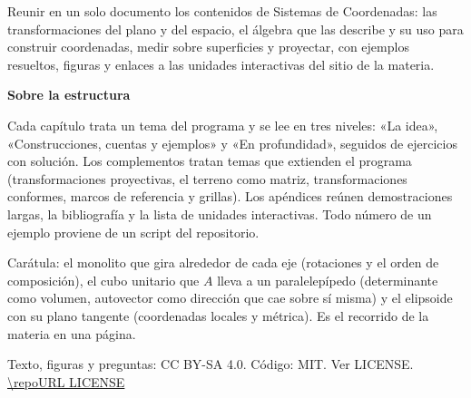\documentclass[11pt,a4paper]{report}
\begin{document}

\begin{titlepage}
\pagecolor{paper}
\noindent
\newcommand{\portadaAutor}{Trabajo final de Sistemas de Coordenadas (CB104, FIUBA) \textperiodcentered{} Gustavo Varela}%
\makebox[\linewidth][l]{}
\end{titlepage}
\setcounter{page}{2}

\clearpage
\thispagestyle{empty}
\vspace*{30mm}
\begin{idea}[Propósito]
Reunir en un solo documento los contenidos de Sistemas de Coordenadas: las transformaciones del
plano y del espacio, el álgebra que las describe y su uso para construir coordenadas, medir
sobre superficies y proyectar, con ejemplos resueltos, figuras y enlaces a las unidades
interactivas del sitio de la materia.
\end{idea}

\vspace{8mm}
{\large\bfseries Sobre la estructura\par}
{\color{muted}Cada capítulo trata un tema del programa y se lee en tres niveles: «La idea»,
«Construcciones, cuentas y ejemplos» y «En profundidad», seguidos de ejercicios con
solución. Los complementos tratan temas que extienden el programa (transformaciones
proyectivas, el terreno como matriz, transformaciones conformes, marcos de referencia y
grillas). Los apéndices reúnen demostraciones largas, la bibliografía y la lista de
unidades interactivas. Todo número de un ejemplo proviene de un script del repositorio.\par}

\vspace{8mm}
{\color{muted}\small Carátula: el monolito que gira alrededor de cada eje (rotaciones y el orden de composición), el cubo unitario que $A$ lleva a un paralelepípedo (determinante como volumen, autovector como dirección que cae sobre sí misma) y el elipsoide con su plano tangente (coordenadas locales y métrica). Es el recorrido de la materia en una página.\par}

\vfill
{\color{muted}\small
Texto, figuras y preguntas: CC BY-SA 4.0. Código: MIT. Ver LICENSE.\\
\expandafter\url\expandafter{\repoURL LICENSE}\par}

\nopagecolor

\tableofcontents
\newpage
\end{document}
